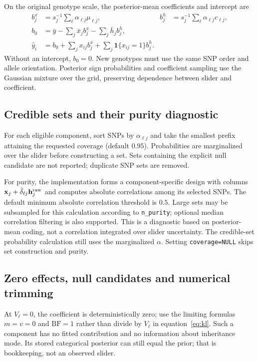 \documentclass[11pt]{article}
\newcommand{\BF}{\mathrm{BF}}
\newcommand{\ind}{\mathbf 1}
\begin{document}
On the original genotype scale, the posterior-mean coefficients and
intercept are
\begin{align}
 b_j^x&=s_j^{-1}\sum_\ell\alpha_{\ell j}\mu_{\ell j},&
 b_j^h&=s_j^{-1}\sum_\ell\alpha_{\ell j}c_{\ell j},\nonumber\\
 b_0&=\bar y-\sum_j\bar x_j b_j^x-\sum_j\bar h_j b_j^h,\nonumber\\
 \widehat y_i&=b_0+\sum_jx_{ij}b_j^x+\sum_j\ind\{x_{ij}=1\}b_j^h.
 \label{eq:prediction}
\end{align}
Without an intercept, $b_0=0$. New genotypes must use the same SNP order
and allele orientation. Posterior sign probabilities and coefficient
sampling use the Gaussian mixture over the grid, preserving dependence
between slider and coefficient.

\subsection{Credible sets and their purity diagnostic}
For each eligible component, sort SNPs by $\alpha_{\ell j}$ and take the
smallest prefix attaining the requested coverage (default $0.95$).
Probabilities are marginalized over the slider before constructing a
set. Sets containing the explicit null candidate are not reported;
duplicate SNP sets are removed.

For purity, the implementation forms a component-specific design with
columns $\mathbf x_j+\bar\delta_{\ell j}\mathbf h_j^{\rm raw}$ and computes
absolute correlations among its selected SNPs. The default minimum
absolute correlation threshold is $0.5$. Large sets may be subsampled
for this calculation according to \texttt{n\_purity}; optional median
correlation filtering is also supported. This is a diagnostic based on
posterior-mean coding, not a correlation integrated over slider uncertainty.
The credible-set probability calculation still uses the marginalized
$\alpha$. Setting \texttt{coverage=NULL} skips set construction and purity.

\subsection{Zero effects, null candidates and numerical trimming}
\label{sec:zero}
At $V_\ell=0$, the coefficient is deterministically zero; use the limiting
formulas $m=v=0$ and $\BF=1$ rather than divide by $V_\ell$ in
equation~\eqref{eq:kl}. Such a component has no fitted contribution and
no information about inheritance mode. Its stored categorical posterior
can still equal the prior; that is bookkeeping, not an observed slider.
\end{document}

